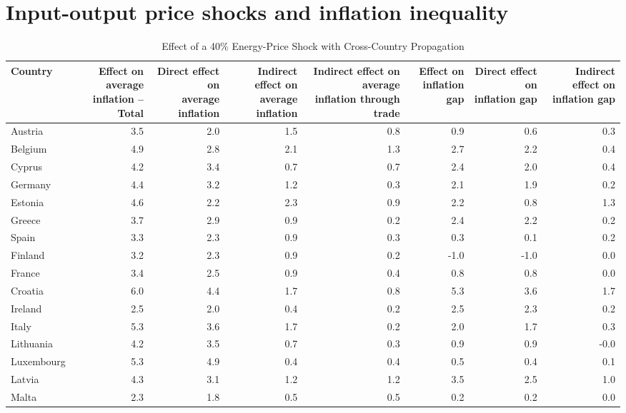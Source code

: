 \section*{Input-output price shocks and inflation inequality}
\begin{table}[H]
\centering
\caption{Effect of a 40\% Energy-Price Shock with Cross-Country Propagation}
\scriptsize
\setlength{\tabcolsep}{1.2pt}
\begin{tabular}{lrrrrrrr}
\toprule
Country & \shortstack{Effect on average\\inflation -- Total} & \shortstack{Direct effect on\\average inflation} & \shortstack{Indirect effect on\\average inflation} & \shortstack{Indirect effect on average\\inflation through trade} & \shortstack{Effect on\\inflation gap} & \shortstack{Direct effect on\\inflation gap} & \shortstack{Indirect effect on\\inflation gap}
 \\
\midrule
Austria & 3.5 & 2.0 & 1.5 & 0.8 & 0.9 & 0.6 & 0.3
 \\
Belgium & 4.9 & 2.8 & 2.1 & 1.3 & 2.7 & 2.2 & 0.4
 \\
Cyprus & 4.2 & 3.4 & 0.7 & 0.7 & 2.4 & 2.0 & 0.4
 \\
Germany & 4.4 & 3.2 & 1.2 & 0.3 & 2.1 & 1.9 & 0.2
 \\
Estonia & 4.6 & 2.2 & 2.3 & 0.9 & 2.2 & 0.8 & 1.3
 \\
Greece & 3.7 & 2.9 & 0.9 & 0.2 & 2.4 & 2.2 & 0.2
 \\
Spain & 3.3 & 2.3 & 0.9 & 0.3 & 0.3 & 0.1 & 0.2
 \\
Finland & 3.2 & 2.3 & 0.9 & 0.2 & -1.0 & -1.0 & 0.0
 \\
France & 3.4 & 2.5 & 0.9 & 0.4 & 0.8 & 0.8 & 0.0
 \\
Croatia & 6.0 & 4.4 & 1.7 & 0.8 & 5.3 & 3.6 & 1.7
 \\
Ireland & 2.5 & 2.0 & 0.4 & 0.2 & 2.5 & 2.3 & 0.2
 \\
Italy & 5.3 & 3.6 & 1.7 & 0.2 & 2.0 & 1.7 & 0.3
 \\
Lithuania & 4.2 & 3.5 & 0.7 & 0.3 & 0.9 & 0.9 & -0.0
 \\
Luxembourg & 5.3 & 4.9 & 0.4 & 0.4 & 0.5 & 0.4 & 0.1
 \\
Latvia & 4.3 & 3.1 & 1.2 & 1.2 & 3.5 & 2.5 & 1.0
 \\
Malta & 2.3 & 1.8 & 0.5 & 0.5 & 0.2 & 0.2 & 0.0

\end{tabular}
\end{table}
